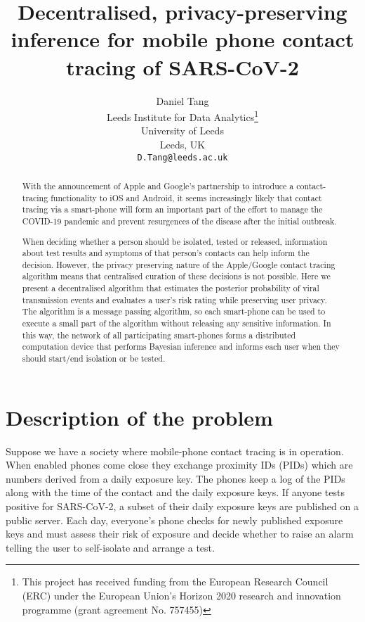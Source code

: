 \documentclass{article}
\title{Decentralised, privacy-preserving inference for mobile phone contact tracing of SARS-CoV-2}
\author{
  Daniel Tang\\
  Leeds Institute for Data Analytics\thanks{This project has received funding from the European Research Council (ERC) under the European Union’s Horizon 2020 research and innovation programme (grant agreement No. 757455)}\\
  University of Leeds\\
  Leeds, UK\\
  \texttt{D.Tang@leeds.ac.uk} \\
}
\begin{document}
\maketitle

\begin{abstract}
With the announcement of Apple and Google's partnership to introduce a contact-tracing functionality to iOS and Android, it seems increasingly likely that contact tracing via a smart-phone will form an important part of the effort to manage the COVID-19 pandemic and prevent resurgences of the disease after the initial outbreak.

When deciding whether a person should be isolated, tested or released, information about test results and symptoms of that person's contacts can help inform the decision. However, the privacy preserving nature of the Apple/Google contact tracing algorithm means that centralised curation of these decisions is not possible. Here we present a decentralised algorithm that estimates the posterior probability of viral transmission events and evaluates a user's risk rating while preserving user privacy. The algorithm is a message passing algorithm, so each smart-phone can be used to execute a small part of the algorithm without releasing any sensitive information. In this way, the network of all participating smart-phones forms a distributed computation device that performs Bayesian inference and informs each user when they should start/end isolation or be tested. 

\end{abstract}


\section{Description of the problem}

Suppose we have a society where mobile-phone contact tracing is in operation. When enabled phones come close they exchange proximity IDs (PIDs) which are numbers derived from a daily exposure key. The phones keep a log of the PIDs along with the time of the contact and the daily exposure keys. If anyone tests positive for SARS-CoV-2, a subset of their daily exposure keys are published on a public server. Each day, everyone's phone checks for newly published exposure keys and must assess their risk of exposure and decide whether to raise an alarm telling the user to self-isolate and arrange a test.
\end{document}

